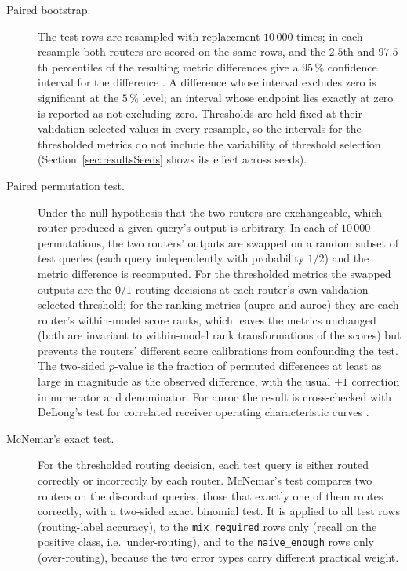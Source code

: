 \documentclass[english, bibtex]{kththesis}               %
\numberwithin{listing}{chapter}
\begin{document}
\begin{description}
\item[Paired bootstrap.] The test rows are resampled with replacement $10\,000$ times; in each resample both routers are scored on the same rows, and the $2.5$th and $97.5$th percentiles of the resulting metric differences give a $95\,\%$ confidence interval for the difference \cite{efron1979bootstrap}. A difference whose interval excludes zero is significant at the $5\,\%$ level; an interval whose endpoint lies exactly at zero is reported as not excluding zero. Thresholds are held fixed at their validation-selected values in every resample, so the intervals for the thresholded metrics do not include the variability of threshold selection (Section~\ref{sec:resultsSeeds} shows its effect across seeds).
\item[Paired permutation test.] Under the null hypothesis that the two routers are exchangeable, which router produced a given query's output is arbitrary. In each of $10\,000$ permutations, the two routers' outputs are swapped on a random subset of test queries (each query independently with probability $1/2$) and the metric difference is recomputed. For the thresholded metrics the swapped outputs are the $0/1$ routing decisions at each router's own validation-selected threshold; for the ranking metrics (\gls{auprc} and \gls{auroc}) they are each router's within-model score ranks, which leaves the metrics unchanged (both are invariant to within-model rank transformations of the scores) but prevents the routers' different score calibrations from confounding the test. The two-sided $p$-value is the fraction of permuted differences at least as large in magnitude as the observed difference, with the usual $+1$ correction in numerator and denominator. For \gls{auroc} the result is cross-checked with DeLong's test for correlated receiver operating characteristic curves \cite{delong1988}.
\item[McNemar's exact test.] For the thresholded routing decision, each test query is either routed correctly or incorrectly by each router. McNemar's test \cite{mcnemar1947} compares two routers on the discordant queries, those that exactly one of them routes correctly, with a two-sided exact binomial test. It is applied to all test rows (routing-label accuracy), to the \texttt{mix\_required} rows only (recall on the positive class, i.e.\ under-routing), and to the \texttt{naive\_enough} rows only (over-routing), because the two error types carry different practical weight.
\end{description}
\end{document}
